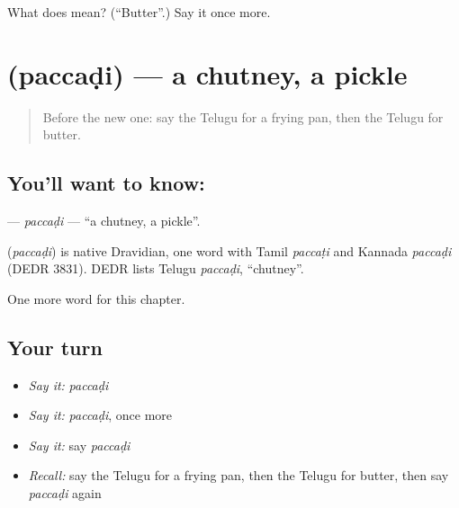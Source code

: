 \begin{tcolorbox}[breakable,colback=teal!4,colframe=teal!35!black,title={Before you move on}]
What does  mean? (\textquotedblleft{}Butter\textquotedblright{}.) Say it once more.
\end{tcolorbox}
\section[\texorpdfstring{\te{పచ్చడి} (paccaḍi)}{పచ్చడి (paccaḍi)}]{ (paccaḍi) — a chutney, a pickle}

\label{lesson:TE-C184-paccadi}



\begin{quote}
Before the new one: say the Telugu for a frying pan, then the Telugu for butter.
\end{quote}

\subsection*{You'll want to know: }
\textbf{} — \emph{paccaḍi} — \textquotedblleft{}a chutney, a pickle\textquotedblright{}.

\begin{cousinweb}
\textbf{} (\emph{paccaḍi}) is native Dravidian, one word with Tamil \emph{paccaṭi} and Kannada \emph{paccaḍi} (DEDR 3831). DEDR lists Telugu \emph{paccaḍi}, \textquotedblleft{}chutney\textquotedblright{}.
\end{cousinweb}

\begin{grammarlens}[title={What you've built}]
One more word for this chapter.
\end{grammarlens}

\subsection*{Your turn}
\begin{itemize}
\raggedright
  \item \emph{Say it:} \emph{paccaḍi}
  \item \emph{Say it:} \emph{paccaḍi}, once more
  \item \emph{Say it:} say \emph{paccaḍi}
  \item \emph{Recall:} say the Telugu for a frying pan, then the Telugu for butter, then say \emph{paccaḍi} again
\end{itemize}

